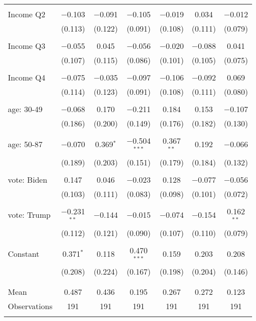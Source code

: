 \begin{tabular}{@{\extracolsep{5pt}}lcccccc}
  & & & & & & \\ 
 Income Q2 & $-$0.103 & $-$0.091 & $-$0.105 & $-$0.019 & 0.034 & $-$0.012 \\ 
  & (0.113) & (0.122) & (0.091) & (0.108) & (0.111) & (0.079) \\ 
  & & & & & & \\ 
 Income Q3 & $-$0.055 & 0.045 & $-$0.056 & $-$0.020 & $-$0.088 & 0.041 \\ 
  & (0.107) & (0.115) & (0.086) & (0.101) & (0.105) & (0.075) \\ 
  & & & & & & \\ 
 Income Q4 & $-$0.075 & $-$0.035 & $-$0.097 & $-$0.106 & $-$0.092 & 0.069 \\ 
  & (0.114) & (0.123) & (0.091) & (0.108) & (0.111) & (0.080) \\ 
  & & & & & & \\ 
 age: 30-49 & $-$0.068 & 0.170 & $-$0.211 & 0.184 & 0.153 & $-$0.107 \\ 
  & (0.186) & (0.200) & (0.149) & (0.176) & (0.182) & (0.130) \\ 
  & & & & & & \\ 
 age: 50-87 & $-$0.070 & 0.369$^{*}$ & $-$0.504$^{***}$ & 0.367$^{**}$ & 0.192 & $-$0.066 \\ 
  & (0.189) & (0.203) & (0.151) & (0.179) & (0.184) & (0.132) \\ 
  & & & & & & \\ 
 vote: Biden & 0.147 & 0.046 & $-$0.023 & 0.128 & $-$0.077 & $-$0.056 \\ 
  & (0.103) & (0.111) & (0.083) & (0.098) & (0.101) & (0.072) \\ 
  & & & & & & \\ 
 vote: Trump & $-$0.231$^{**}$ & $-$0.144 & $-$0.015 & $-$0.074 & $-$0.154 & 0.162$^{**}$ \\ 
  & (0.112) & (0.121) & (0.090) & (0.107) & (0.110) & (0.079) \\ 
  & & & & & & \\ 
 Constant & 0.371$^{*}$ & 0.118 & 0.470$^{***}$ & 0.159 & 0.203 & 0.208 \\ 
  & (0.208) & (0.224) & (0.167) & (0.198) & (0.204) & (0.146) \\ 
  & & & & & & \\ 
\hline \\[-1.8ex] 
Mean & 0.487 & 0.436 & 0.195 & 0.267 & 0.272 & 0.123 \\ 
Observations & 191 & 191 & 191 & 191 & 191 & 191 \\ 
\hline 
\hline \\[-1.8ex] 
\end{tabular} 
